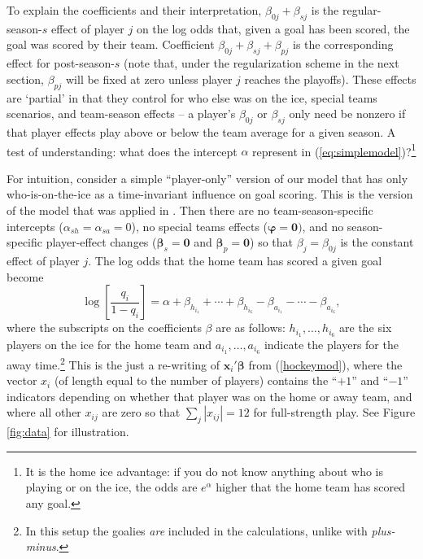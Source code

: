 To explain the coefficients and their interpretation, 
$\beta_{0j} + \beta_{sj}$ is the regular-season-$s$ effect of player $j$ on the log
odds that, given a goal has been scored, the goal was scored by their team.  Coefficient 
$\beta_{0j} + \beta_{sj} + \beta_{pj}$ is the corresponding effect for post-season-$s$ (note that, under the regularization scheme in the next section, $\beta_{pj}$ will be fixed at zero unless player $j$ reaches the playoffs). 
These effects are `partial' in that they control for who else was on the ice,
special teams scenarios, and team-season effects -- a player's
$\beta_{0j}$ or $\beta_{sj}$ only need be nonzero if that player effects play
above or below the team average for a given season.  A test of
understanding: what does the intercept $\alpha$ represent in
(\ref{eq:simplemodel})?\footnote{It is the home ice advantage: if you do not
know anything about who is playing or on the ice, the odds are $e^{\alpha}$
higher that the home team has scored any goal.}


For intuition, consider a simple ``player-only'' version of our model that has
only who-is-on-the-ice as a time-invariant influence on goal scoring.  This is the version of the model that was applied in \cite{gramacy:jensen:taddy:2013}.  Then
there are no team-season-specific intercepts ($\alpha_{sh}=\alpha_{sa}=0$), no
special teams effects ($\boldsymbol{\varphi}=\mathbf{0})$, and no season-specific
player-effect changes ($\boldsymbol{\beta}_s = \mathbf{0}$ and $\boldsymbol{\beta}_p = \mathbf{0}$)  so that $\beta_j
= \beta_{0j}$ is the constant effect of player $j$.  The log odds that the
home team has scored a given goal become \begin{equation} \log
\left[\frac{q_i}{1-q_i} \right]  = \alpha + \beta_{h_{i_1}} + \cdots +
\beta_{h_{i_6}} -  \beta_{a_{i_1}} - \cdots - \beta_{a_{i_6}},
\label{eq:simplemodel} \end{equation} where the subscripts on the coefficients
$\beta$ are as follows: $h_{i_1}, \dots, h_{i_6}$ are the six players on the
ice for the home team and  $a_{i_1}, \dots, a_{i_6}$ indicate the players for
the away time.\footnote{In this setup the goalies {\em are} included in the
calculations, unlike with {\em plus-minus}.}  This is the just a re-writing of
$\mathbf{x}_i'\boldsymbol{\beta}$ from (\ref{hockeymod}), where the vector
$x_i$ (of length equal to the number of players) contains the ``$+1$'' and
``$-1$'' indicators depending on whether that player was on the home or away
team, and where all other $x_{ij}$ are zero so that $\sum_j |x_{ij}| = 12$ for
full-strength play. See Figure \ref{fig:data} for illustration. 

